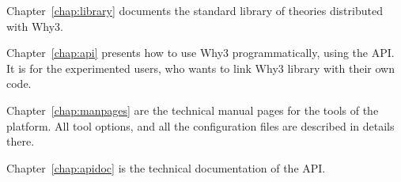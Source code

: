 Chapter~\ref{chap:library} documents the standard library of theories
distributed with Why3. 


Chapter~\ref{chap:api} presents how to use Why3 programmatically,
using the API.  It is for the experimented users, who wants to link
Why3 library with their own code.

Chapter~\ref{chap:manpages} are the technical manual pages for the
tools of the platform. All tool options, and all the configuration
files are described in details there.

Chapter~\ref{chap:apidoc} is the technical documentation of the API.



